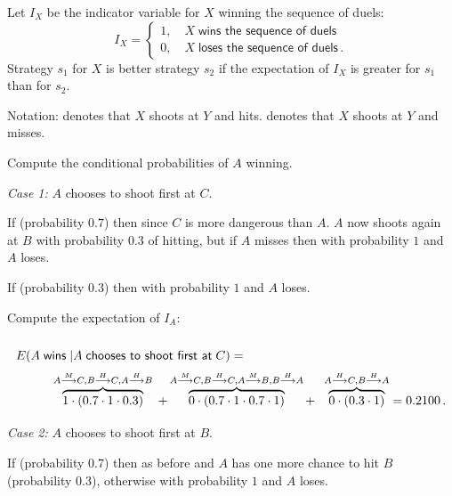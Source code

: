 \solution{}

Let $I_X$ be the indicator variable for $X$ winning the sequence of duels:
\begin{equation}
I_X=
\left\{
\begin{array}{ll}
1,\quad X\;\textsf{wins the sequence of duels}\\
0, \quad X\; \textsf{loses the sequence of duels}\,.
\end{array}
\right.
\end{equation}
Strategy $s_1$ for $X$ is better strategy $s_2$ if the expectation of $I_X$ is greater for $s_1$ than for $s_2$.

Notation:  denotes that $X$ shoots at $Y$ and hits.  denotes that $X$ shoots at $Y$ and misses.

Compute the conditional probabilities of $A$ winning.

\textit{Case 1:} $A$ chooses to shoot first at $C$.

If  (probability $0.7$) then  since $C$ is more dangerous than $A$. $A$ now shoots again at $B$ with probability $0.3$ of hitting, but if $A$ misses then  with probability $1$ and $A$ loses.

If  (probability $0.3$) then  with probability $1$ and $A$ loses.

Compute the expectation of $I_A$:
\vspace*{-3ex}
\[
\renewcommand*{\arraystretch}{2.5}
\begin{array}{l}
E(A \;\textsf{wins}\;|A\;\textsf{chooses to shoot first at}\;C) =\\
%
\qquad\quad \overbrace{1\cdot (0.7\cdot 1 \cdot 0.3)}^%
{\duelmath{A}{M}{C}, \duelmath{B}{H}{C}, \duelmath{A}{H}{B}}\; +
%
\overbrace{0\cdot (0.7\cdot 1\cdot 0.7\cdot 1)}^%
{\duelmath{A}{M}{C},  \duelmath{B}{H}{C}, \duelmath{A}{M}{B}, \duelmath{B}{H}{A}}+
%
\;\;\overbrace{0\cdot (0.3\cdot 1)}^%
{\duelmath{A}{H}{C}, \duelmath{B}{H}{A}}=0.2100\,.
\end{array}
\]
\textit{Case 2:} $A$ chooses to shoot first at $B$.

If  (probability $0.7$) then as before  and $A$ has one more chance to hit $B$ (probability $0.3$), otherwise  with probability $1$ and $A$ loses.

